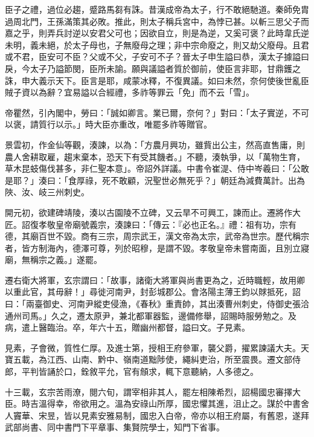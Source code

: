 \begin{pinyinscope}
 臣子之禮，過位必趨，蹙路馬芻有誅。昔漢成帝為太子，行不敢絕馳道。秦師免胄過周北門，王孫滿策其必敗。推此，則太子稱兵宮中，為悖已甚。以斬三思父子而嘉之乎，則弄兵討逆以安君父可也；因欲自立，則是為逆，又奚可褒？此時韋氏逆未明，義未絕，於太子母也，子無廢母之理；非中宗命廢之，則又劫父廢母。且君或不君，臣安可不臣？父或不父，子安可不子？晉太子申生謚曰恭，漢太子據謚曰戾，今太子乃謚節閔，臣所未諭。願與議謚者質於御前，使臣言非耶，甘鼎鑊之誅，申大義示天下。臣言是耶，咸蒙冰釋，不復異議。如曰未然，奈何使後世亂臣賊子資以為辭？宜易謚以合經禮，多祚等罪云「免」而不云「雪」。



 帝瞿然，引內閣中，勞曰：「誠如卿言。業已爾，奈何？」對曰：「太子實逆，不可以褒，請質行以示。」時大臣亦重改，唯罷多祚等贈官。



 景雲初，作金仙等觀，湊諫，以為：「方農月興功，雖貲出公主，然高直售庸，則農人舍耕取雇，趨末棄本，恐天下有受其饑者。」不聽，湊執爭，以「萬物生育，草木昆蚑傷伐甚多，非仁聖本意」。帝詔外詳議。中書令崔湜、侍中岑羲曰：「公敢是耶？」湊曰：「食厚祿，死不敢顧，況聖世必無死乎？」朝廷為減費萬計。出為陜、汝、岐三州刺史。



 開元初，欲建碑靖陵，湊以古園陵不立碑，又云旱不可興工，諫而止。遷將作大匠。詔復孝敬皇帝廟號義宗，湊諫曰：「傳云：『必也正名。』禮：祖有功，宗有德，其廟百世不毀。商有三宗，周宗武王，漢文帝為太宗，武帝為世宗。歷代稱宗者，皆方制海內，德澤可尊，列於昭穆，是謂不毀。孝敬皇帝未嘗南面，且別立寢廟，無稱宗之義。」遂罷。



 遷右衛大將軍，玄宗謂曰：「故事，諸衛大將軍與尚書更為之，近時職輕，故用卿以重此官，其毋辭！」尋徙河南尹，封彭城郡公。會洛陽主薄王鈞以賕抵死，詔曰：「兩臺御史、河南尹縱吏侵漁，《春秋》重責帥，其出湊曹州刺史，侍御史張洽通州司馬。」久之，遷太原尹，兼北都軍器監，邊備修舉，詔賜時服勞勉之。及病，遣上醫臨治。卒，年六十五，贈幽州都督，謚曰文。子見素。



 見素，子會微，質性仁厚。及進士第，授相王府參軍，襲父爵，擢累諫議大夫。天寶五載，為江西、山南、黔中、嶺南道黜陟使，繩糾吏治，所至震畏。遷文部侍郎，平判皆誦於口，銓敘平允，官有頠求，輒下意聽納，人多德之。



 十三載，玄宗苦雨潦，閱六旬，謂宰相非其人，罷左相陳希烈，詔楊國忠審擇大臣。時吉溫得幸，帝欲用之。溫為安祿山所厚，國忠懼其進，沮止之。謀於中書舍人竇華、宋昱，皆以見素安雅易制，國忠入白帝，帝亦以相王府屬，有舊恩，遂拜武部尚書、同中書門下平章事、集賢院學士，知門下省事。




\end{pinyinscope}
